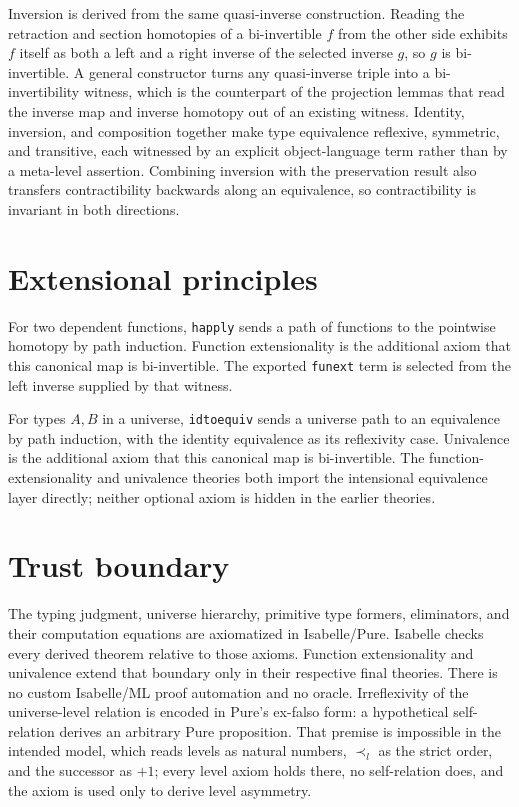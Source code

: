 \documentclass[11pt,a4paper]{article}
\begin{document}
Inversion is derived from the same quasi-inverse construction. Reading the
retraction and section homotopies of a bi-invertible \(f\) from the other side
exhibits \(f\) itself as both a left and a right inverse of the selected
inverse \(g\), so \(g\) is bi-invertible. A general constructor turns any
quasi-inverse triple into a bi-invertibility witness, which is the counterpart
of the projection lemmas that read the inverse map and inverse homotopy out of
an existing witness. Identity, inversion, and composition together make type
equivalence reflexive, symmetric, and transitive, each witnessed by an explicit
object-language term rather than by a meta-level assertion. Combining inversion
with the preservation result also transfers contractibility backwards along an
equivalence, so contractibility is invariant in both directions.

\section{Extensional principles}

For two dependent functions, \texttt{happly} sends a path of functions to the
pointwise homotopy by path induction. Function extensionality is the additional
axiom that this canonical map is bi-invertible. The exported \texttt{funext}
term is selected from the left inverse supplied by that witness.

For types \(A,B\) in a universe, \texttt{idtoequiv} sends a universe path to an
equivalence by path induction, with the identity equivalence as its reflexivity
case. Univalence is the additional axiom that this canonical map is
bi-invertible. The function-extensionality and univalence theories both import
the intensional equivalence layer directly; neither optional axiom is hidden in
the earlier theories.

\section{Trust boundary}

The typing judgment, universe hierarchy, primitive type formers, eliminators,
and their computation equations are axiomatized in Isabelle/Pure. Isabelle
checks every derived theorem relative to those axioms. Function extensionality
and univalence extend that boundary only in their respective final theories.
There is no custom Isabelle/ML proof automation and no oracle. Irreflexivity of
the universe-level relation is encoded in Pure's ex-falso form: a hypothetical
self-relation derives an arbitrary Pure proposition. That premise is impossible
in the intended model, which reads levels as natural numbers, \(\prec_l\) as
the strict order, and the successor as \(+1\); every level axiom holds there,
no self-relation does, and the axiom is used only to derive level asymmetry.
\end{document}
